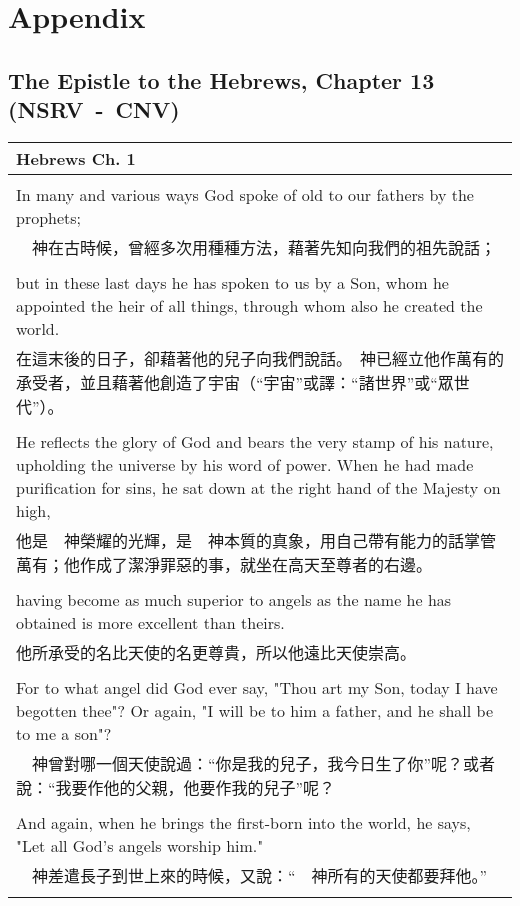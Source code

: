 \documentclass{book}
\begin{document}
\chapter*{Appendix}
\section{The Epistle to the Hebrews, Chapter 13 (NSRV~-~CNV)}
\footnotesize
\begin{tabularx}{\textwidth}{p{}}
\hline
Hebrews Ch. 1 \\
\hline \\
In many and various ways God spoke of old to our fathers by the prophets; \\
 　神在古時候，曾經多次用種種方法，藉著先知向我們的祖先說話； \\ \\
but in these last days he has spoken to us by a Son, whom he appointed the heir of all things, through whom also he created the world. \\
 在這末後的日子，卻藉著他的兒子向我們說話。　神已經立他作萬有的承受者，並且藉著他創造了宇宙（“宇宙”或譯：“諸世界”或“眾世代”）。 \\ \\
He reflects the glory of God and bears the very stamp of his nature, upholding the universe by his word of power. When he had made purification for sins, he sat down at the right hand of the Majesty on high, \\
 他是　神榮耀的光輝，是　神本質的真象，用自己帶有能力的話掌管萬有；他作成了潔淨罪惡的事，就坐在高天至尊者的右邊。 \\ \\
having become as much superior to angels as the name he has obtained is more excellent than theirs. \\
 他所承受的名比天使的名更尊貴，所以他遠比天使崇高。 \\ \\
For to what angel did God ever say, "Thou art my Son, today I have begotten thee"? Or again, "I will be to him a father, and he shall be to me a son"? \\
 　神曾對哪一個天使說過：“你是我的兒子，我今日生了你”呢？或者說：“我要作他的父親，他要作我的兒子”呢？ \\ \\
And again, when he brings the first-born into the world, he says, "Let all God's angels worship him." \\
 　神差遣長子到世上來的時候，又說：“　神所有的天使都要拜他。” \\ \\

\end{tabularx}
\end{document}
